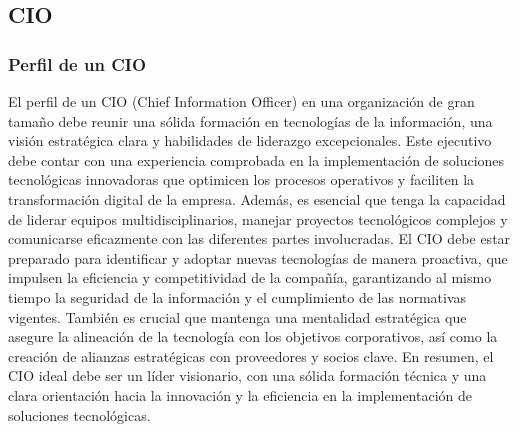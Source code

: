 
\subsection{CIO}
    \subsubsection{Perfil de un CIO}
    El perfil de un CIO (Chief Information Officer) en una organización de gran tamaño debe reunir una sólida formación en tecnologías de la información, una visión estratégica clara y habilidades de liderazgo excepcionales. Este ejecutivo debe contar con una experiencia comprobada en la implementación de soluciones tecnológicas innovadoras que optimicen los procesos operativos y faciliten la transformación digital de la empresa. Además, es esencial que tenga la capacidad de liderar equipos multidisciplinarios, manejar proyectos tecnológicos complejos y comunicarse eficazmente con las diferentes partes involucradas. 
    El CIO debe estar preparado para identificar y adoptar nuevas tecnologías de manera proactiva, que impulsen la eficiencia y competitividad de la compañía, garantizando al mismo tiempo la seguridad de la información y el cumplimiento de las normativas vigentes. También es crucial que mantenga una mentalidad estratégica que asegure la alineación de la tecnología con los objetivos corporativos, así como la creación de alianzas estratégicas con proveedores y socios clave. En resumen, el CIO ideal debe ser un líder visionario, con una sólida formación técnica y una clara orientación hacia la innovación y la eficiencia en la implementación de soluciones tecnológicas. 
